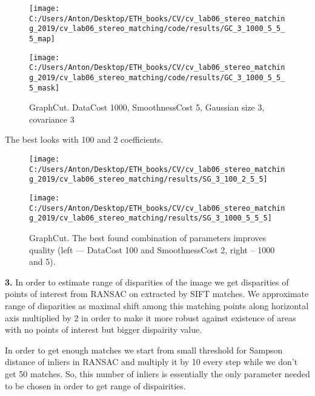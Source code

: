 \documentclass{report}
\begin{document}
\begin{figure}[h]
	\begin{center}
		\begin{minipage}[h]{0.45\linewidth}
			\texttt{[image: C:/Users/Anton/Desktop/ETH\_books/CV/cv\_lab06\_stereo\_matching\_2019/cv\_lab06\_stereo\_matching/code/results/GC\_3\_1000\_5\_5\_5\_map]}
		\end{minipage}
		\hfill
		\begin{minipage}[h]{0.45\linewidth}
			\texttt{[image: C:/Users/Anton/Desktop/ETH\_books/CV/cv\_lab06\_stereo\_matching\_2019/cv\_lab06\_stereo\_matching/code/results/GC\_3\_1000\_5\_5\_5\_mask]}			
		\end{minipage}
		\caption{GraphCut. DataCost 1000, SmoothnessCost 5, Gaussian size 3, covariance 3}
	\end{center}
\end{figure}

The best looks with 100 and 2 coefficients.
\begin{figure}[h]
	\begin{center}
		\begin{minipage}[h]{0.49\linewidth}
			\texttt{[image: C:/Users/Anton/Desktop/ETH\_books/CV/cv\_lab06\_stereo\_matching\_2019/cv\_lab06\_stereo\_matching/results/SG\_3\_100\_2\_5\_5]}
		\end{minipage}
		\hfill
		\begin{minipage}[h]{0.49\linewidth}
			\texttt{[image: C:/Users/Anton/Desktop/ETH\_books/CV/cv\_lab06\_stereo\_matching\_2019/cv\_lab06\_stereo\_matching/results/SG\_3\_1000\_5\_5\_5]}
		\end{minipage}
		\caption{GraphCut. The best found combination of parameters improves quality (left --- DataCost 100 and SmoothnessCost 2, right -- 1000 and 5).}
	\end{center}
\end{figure}
\newpage
\textbf{3.} In order to estimate range of disparities of the image we get disparities of points of interest from RANSAC on extracted by SIFT
matches. We approximate range of disparities as maximal shift among this
matching points along horizontal axis multiplied by 2 in order to make
it more robust against existence of areas with no points of interest but
bigger dispairity value.

In order to get enough matches we start from small threshold for Sampson distance of inliers in RANSAC and multiply it by 10 every step while we don't get 50 matches. So, this number of inliers is essentially the only parameter needed to be chosen in order to get range of dispairities.
\end{document}
